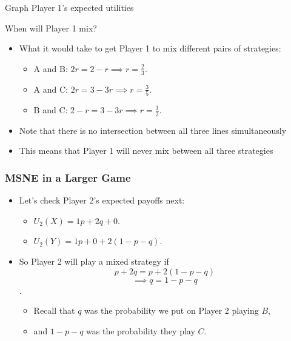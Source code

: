 \begin{frame}{Graph Player 1's expected utilities}
\end{frame}

\begin{frame}{When will Player 1 mix?}
  \begin{itemize}
    \item What it would take to get Player 1 to mix different pairs of strategies:
	\begin{itemize}
		\item A and B: $2r = 2 - r \implies r = \frac{2}{3}$.
		\item A and C: $2r = 3 - 3r \implies r = \frac{3}{5}$.
		\item B and C: $2 - r = 3 - 3r \implies r = \frac{1}{2}$.
	\end{itemize}

    \item Note that there is no intersection between all three lines simultaneously

    \item This means that Player 1 will never mix between all three strategies
  \end{itemize}
\end{frame}

\begin{frame}
\frametitle{MSNE in a Larger Game}
\begin{itemize}
	\item Let's check Player 2's expected payoffs next:
	\begin{itemize}
		\item $U_2(X) = 1p + 2q + 0$.
		\item $U_2(Y) = 1p + 0 + 2(1 - p - q)$.
	\end{itemize}
	\item So Player 2 will play a mixed strategy if
  $$p + 2q = p + 2(1 - p - q)$$ 
  $$\implies q = 1 - p - q$$.

  \begin{itemize}
    \item Recall that $q$ was the probability we put on Player 2 playing $B$,
    \item and $1-p-q$ was the probability they play $C$. 
  \end{itemize}

\end{itemize}
\end{frame}

